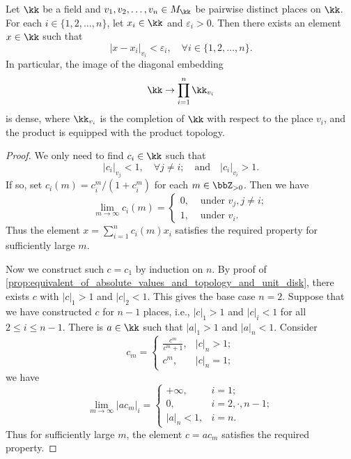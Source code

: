     \begin{theorem}\label{theorem:artin_whaples_approximations}
        Let \(\kk\) be a field and \(v_1, v_2, \ldots, v_n \in M_\kk\) be pairwise distinct places on \(\kk\).
        For each \(i \in \{1,2,\ldots,n\}\), let \(x_i \in \kk\) and \(\varepsilon_i > 0\).
        Then there exists an element \(x \in \kk\) such that
        \[ |x - x_i|_{v_i} < \varepsilon_i, \quad \forall i \in \{1,2,\ldots,n\}. \]
        In particular, the image of the diagonal embedding
        \[ \kk \to \prod_{i=1}^n \kk_{v_i} \]
        is dense, where \(\kk_{v_i}\) is the completion of \(\kk\) with respect to the place \(v_i\), and the product is equipped with the product topology.
    \end{theorem}
    \begin{proof}
        We only need to find \(c_i \in \kk\) such that
        \[ |c_i|_{v_j} < 1, \quad \forall j \neq i; \quad \text{and} \quad |c_i|_{v_i} > 1. \]
        If so, set \(c_i(m) = c_i^m/(1+c_i^m)\) for each \(m \in \bbZ_{>0}\).
        Then we have
        \[ \lim_{m \to \infty} c_i(m) = \begin{cases}
            0, & \text{ under } v_j, j \neq i; \\
            1, & \text{ under } v_i.
        \end{cases} \]
        Thus the element \(x = \sum_{i=1}^n c_i(m) x_i\) satisfies the required property for sufficiently large \(m\).

        Now we construct such \(c=c_1\) by induction on \(n\).
        By proof of \cref{prop:equivalent_of_absolute_values_and_topology_and_unit_disk}, there exists \(c\) with \(|c|_1>1\) and \(|c|_2 < 1\).
        This gives the base case \(n=2\).
        Suppose that we have constructed \(c\) for \(n-1\) places, i.e., \(|c|_1 > 1\) and \(|c|_i < 1\) for all \(2 \leq i \leq n-1\).
        There is \(a \in \kk\) such that \(|a|_1 > 1\) and \(|a|_n < 1\).
        Consider 
        \[ c_m = \begin{cases}
            \frac{c^m}{c^m +1}, & |c|_n > 1;\\
            c^m, & |c|_n = 1;
        \end{cases} \]
        we have 
        \[ \lim_{m \to \infty} |ac_m|_i = \begin{cases}
            +\infty, & i = 1; \\
            0, & i=2,\cdot,n-1;\\
            |a|_n<1, & i = n.
        \end{cases} \]
        Thus for sufficiently large \(m\), the element \(c = ac_m\) satisfies the required property.
    \end{proof}




